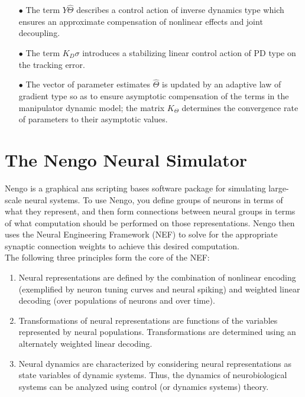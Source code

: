 \begin{itemize}
\item[$\bullet$] The term $Y\hat{\Theta}$ describes a control action of inverse dynamics type which ensures an approximate compensation of nonlinear effects and joint decoupling.
\item[$\bullet$] The term $K_D\sigma$ introduces a stabilizing linear control action of PD type on the tracking error.
\item[$\bullet$] The vector of parameter estimates $\hat{\Theta}$ is updated by an adaptive law of gradient type so as to ensure asymptotic compensation of the terms in the manipulator dynamic model; the matrix $K_\Theta$ determines the convergence rate of parameters to their asymptotic values.
\end{itemize}

\section{The Nengo Neural Simulator}
Nengo\cite{brain} is a graphical ans scripting bases software package for simulating large-scale neural systems. To use Nengo, you define groups of neurons in terms of what they represent, and then form connections between neural groups in terms of what computation should be performed on those representations. Nengo then uses the Neural Engineering Framework (NEF) to solve for the appropriate synaptic connection weights to achieve this desired computation.\\

The following three principles form the core of the NEF:

\begin{enumerate}
\item Neural representations are defined by the combination of nonlinear
encoding (exemplified by neuron tuning curves and neural spiking) and
weighted linear decoding (over populations of neurons and over time).
\item Transformations of neural representations are functions of the variables
represented by neural populations. Transformations are determined
using an alternately weighted linear decoding.
\item Neural dynamics are characterized by considering neural
representations as state variables of dynamic systems. Thus, the
dynamics of neurobiological systems can be analyzed using control (or
dynamics systems) theory.
\end{enumerate}

